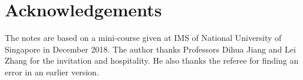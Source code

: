 \documentclass{ims9x6}
\begin{document}
\section*{Acknowledgements}
The notes are based on a mini-course given at IMS of National University of Singapore in December 2018. The author thanks Professors Dihua Jiang and Lei Zhang for the invitation and hospitality. He also thanks the referee for finding an error in an earlier version.


\providecommand{\bysame}{\leavevmode\hbox to3em{\hrulefill}\thinspace}
\providecommand{\MR}{\relax\ifhmode\unskip\space\fi MR }
\providecommand{\MRhref}[2]{%
  \href{http://www.ams.org/mathscinet-getitem?mr=#1}{#2}
}
\providecommand{\href}[2]{#2}
\end{document}
